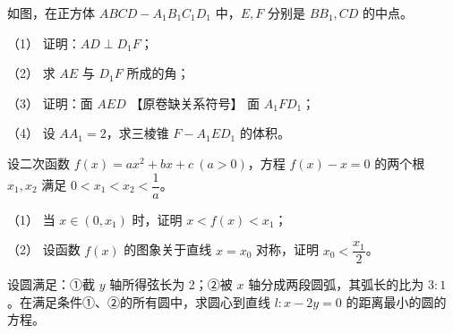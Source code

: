 \begin{question}
如图，在正方体 $ABCD-A_1B_1C_1D_1$ 中，$E,F$ 分别是 $BB_1,CD$ 的中点。

（1） 证明：$AD\perp D_1F$；

（2） 求 $AE$ 与 $D_1F$ 所成的角；

（3） 证明：面 $AED$ 【原卷缺关系符号】 面 $A_1FD_1$；

（4） 设 $AA_1=2$，求三棱锥 $F-A_1ED_1$ 的体积。
\nopagebreak[4]
\begin{center}\end{center}
\nopagebreak[4]
\end{question}
\begin{question}
设二次函数 $f(x)=ax^2+bx+c\ (a>0)$，方程 $f(x)-x=0$ 的两个根 $x_1,x_2$ 满足 $0<x_1<x_2<\dfrac1a$。

（1） 当 $x\in(0,x_1)$ 时，证明 $x<f(x)<x_1$；

（2） 设函数 $f(x)$ 的图象关于直线 $x=x_0$ 对称，证明 $x_0<\dfrac{x_1}{2}$。

\end{question}
\begin{question}
设圆满足：①截 $y$ 轴所得弦长为 2；②被 $x$ 轴分成两段圆弧，其弧长的比为 $3:1$。在满足条件①、②的所有圆中，求圆心到直线 $l:x-2y=0$ 的距离最小的圆的方程。

\end{question}